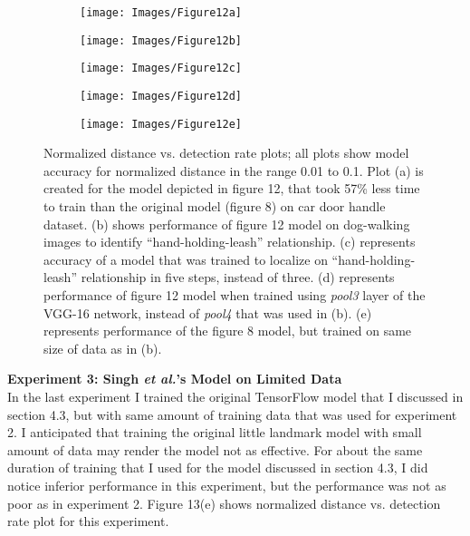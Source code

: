 \documentclass [11pt,letterpaper ,twoside ,openany ]{report}
\begin{document}
    \begin{figure}[h!]
    \centering
        \begin{subfigure}[b]{.45\linewidth}
            \texttt{[image: Images/Figure12a]}
            \caption{}
        \end{subfigure}

        \begin{subfigure}[b]{.45\linewidth}
            \texttt{[image: Images/Figure12b]}
            \caption{}
        \end{subfigure}
        \begin{subfigure}[b]{.45\linewidth}
            \texttt{[image: Images/Figure12c]}
            \caption{}
        \end{subfigure}        

        \begin{subfigure}[b]{.45\linewidth}
            \texttt{[image: Images/Figure12d]}
            \caption{}
        \end{subfigure}
        \begin{subfigure}[b]{.45\linewidth}
            \texttt{[image: Images/Figure12e]}
            \caption{}
        \end{subfigure}                
        \caption{Normalized distance vs. detection rate plots; all plots show model accuracy for normalized distance in the range 0.01 to 0.1. Plot (a) is created for the model depicted in figure 12, that took 57\% less time to train than the original model (figure 8) on car door handle dataset. (b) shows performance of figure 12 model on dog-walking images to identify ``hand-holding-leash'' relationship. (c) represents accuracy of a model that was trained to localize on ``hand-holding-leash'' relationship in five steps, instead of three. (d) represents performance of figure 12 model when trained using \textit{pool3} layer of the VGG-16 network, instead of \textit{pool4} that was used in (b). (e) represents performance of the figure 8 model, but trained on same size of data as in (b).}
    \end{figure}   

    \noindent
    \textbf{Experiment 3: Singh \textit{et al.}'s Model on Limited Data}\\             
    In the last experiment I trained the original TensorFlow model that I discussed in section 4.3, but with same amount of training data that was used for experiment 2. I anticipated that training the original little landmark model with small amount of data may render the model not as effective. For about the same duration of training that I used for the model discussed in section 4.3, I did notice inferior performance in this experiment, but the performance was not as poor as in experiment 2. Figure 13(e) shows normalized distance vs. detection rate plot for this experiment. 
\end{document}
